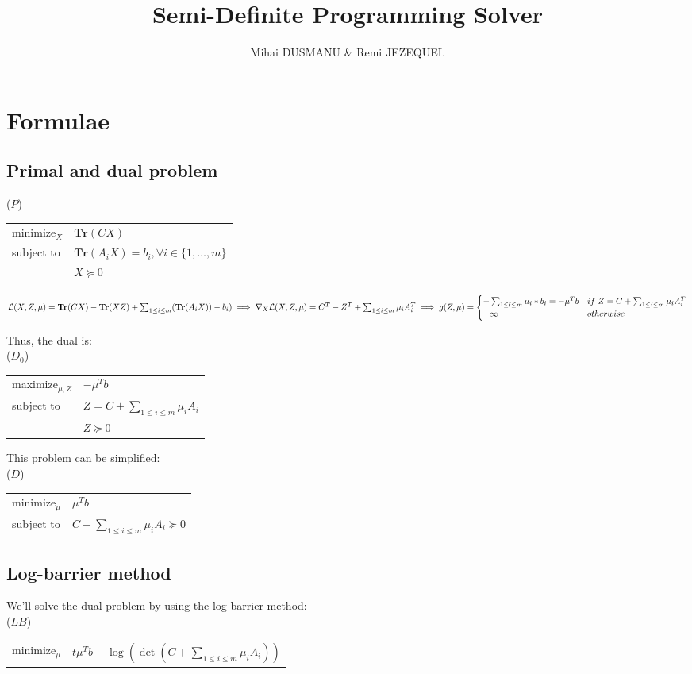 \documentclass{article}
\title{Semi-Definite Programming Solver}
\author{Mihai DUSMANU \& Remi JEZEQUEL}
\begin{document}
	
\maketitle

\section{Formulae}

\subsection{Primal and dual problem}

($P$)\begin{tabular}{l l}
	minimize$_{X}$ & $\mathbf{Tr}(C X)$ \\
	subject to & $\mathbf{Tr}(A_i X) = b_i, \forall i \in \{1, \dots, m\}$ \\
	& $X \succeq 0$  
\end{tabular}

$\mathcal{L}(X, Z, \mu) = \mathbf{Tr}(C X) - \mathbf{Tr}(X Z) + \sum_{1 \leq i \leq m} (\mathbf{Tr}(A_i X)) - b_i) \\
\implies \nabla_X \mathcal{L}(X, Z, \mu) = C^T - Z^T + \sum_{1 \leq i \leq m} \mu_i A_i^T \\
\implies g(Z, \mu) = \begin{cases}
- \sum_{1 \leq i \leq m} \mu_i * b_i = - \mu^T b & if\ Z = C + \sum_{1 \leq i \leq m} \mu_i A_i^T \\ 
- \infty & otherwise 
\end{cases}$

Thus, the dual is: \\
($D_0$)\begin{tabular}{l l}
	maximize$_{\mu, Z}$ & $- \mu^T b$ \\
	subject to & $Z = C + \sum_{1 \leq i \leq m} \mu_i A_i$ \\
	& $Z \succeq 0$
\end{tabular}

This problem can be simplified: \\
($D$)\begin{tabular}{l l}
	minimize$_{\mu}$ & $\mu^T b$ \\
	subject to & $C + \sum_{1 \leq i \leq m} \mu_i A_i \succeq 0$
\end{tabular}

\subsection{Log-barrier method}
We'll solve the dual problem by using the log-barrier method: \\
($LB$)\begin{tabular}{l l}
	minimize$_{\mu}$ & $t \mu^T b - \log(\det(C + \sum_{1 \leq i \leq m} \mu_i A_i))$
\end{tabular}
\end{document}
